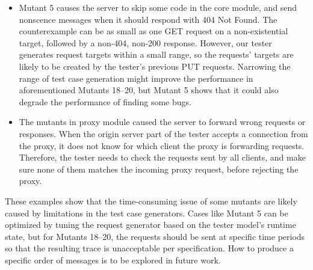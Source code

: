 \begin{itemize}
  \item Mutant 5 causes the server to skip some code in the core module, and
    send nonscence messages when it should respond with 404 Not Found.  The
    counterexample can be as small as one GET request on a non-existential
    target, followed by a non-404, non-200 response.  However, our tester
    generates request targets within a small range, so the requests' targets are
    likely to be created by the tester's previous PUT requests.  Narrowing the
    range of test case generation might improve the performance in
    aforementioned Mutants 18--20, but Mutant 5 shows that it could
    also degrade the performance of finding some bugs.

  \item The mutants in proxy module caused the server to forward wrong requests
    or responses.  When the origin server part of the tester accepts a
    connection from the proxy, it does not know for which client the proxy is
    forwarding requests.  Therefore, the tester needs to check the requests sent
    by all clients, and make sure none of them matches the incoming proxy
    request, before rejecting the proxy.
\end{itemize}

These examples show that the time-consuming issue of some mutants are likely
caused by limitations in the test case generators.  Cases like Mutant 5 can be
optimized by tuning the request generator based on the tester model's runtime
state, but for Mutants 18--20, the requests should be sent at
specific time periods so that the resulting trace is unacceptable per
specification.  How to produce a specific order of messages is to be explored in
future work.
